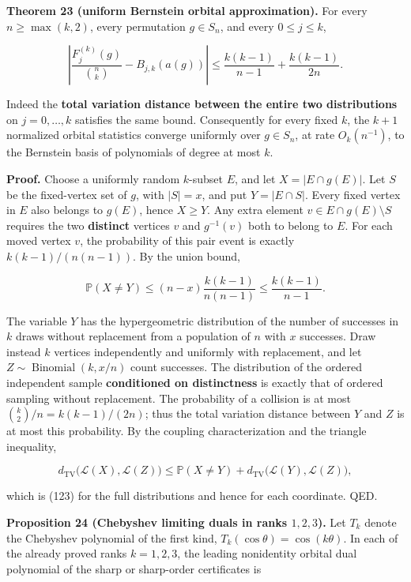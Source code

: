 \documentclass[
  11pt,
]{article}
\begin{document}
\textbf{Theorem 23 (uniform Bernstein orbital approximation).} For every
\(n\ge\max(k,2)\), every permutation \(g\in S_n\), and every
\(0\le j\le k\),

\[
\boxed{
\left|\frac{F_j^{(k)}(g)}{\binom nk}
       -B_{j,k}(a(g))\right|
\le\frac{k(k-1)}{n-1}+\frac{k(k-1)}{2n}.
} \tag{123}
\]

Indeed the \textbf{total variation distance between the entire two
distributions} on \(j=0,\ldots,k\) satisfies the same bound.
Consequently for every fixed \(k\), the \(k+1\) normalized orbital
statistics converge uniformly over \(g\in S_n\), at rate
\(O_k(n^{-1})\), to the Bernstein basis of polynomials of degree at most
\(k\).

\textbf{Proof.} Choose a uniformly random \(k\)-subset \(E\), and let
\(X=|E\cap g(E)|\). Let \(S\) be the fixed-vertex set of \(g\), with
\(|S|=x\), and put \(Y=|E\cap S|\). Every fixed vertex in \(E\) also
belongs to \(g(E)\), hence \(X\ge Y\). Any extra element
\(v\in E\cap g(E)\setminus S\) requires the two \textbf{distinct}
vertices \(v\) and \(g^{-1}(v)\) both to belong to \(E\). For each moved
vertex \(v\), the probability of this pair event is exactly
\(k(k-1)/(n(n-1))\). By the union bound,

\[
\mathbb P(X\ne Y)
\le (n-x)\frac{k(k-1)}{n(n-1)}
\le\frac{k(k-1)}{n-1}. \tag{124}
\]

The variable \(Y\) has the hypergeometric distribution of the number of
successes in \(k\) draws without replacement from a population of \(n\)
with \(x\) successes. Draw instead \(k\) vertices independently and
uniformly with replacement, and let
\(Z\sim\operatorname{Binomial}(k,x/n)\) count successes. The
distribution of the ordered independent sample \textbf{conditioned on
distinctness} is exactly that of ordered sampling without replacement.
The probability of a collision is at most \(\binom k2/n=k(k-1)/(2n)\);
thus the total variation distance between \(Y\) and \(Z\) is at most
this probability. By the coupling characterization and the triangle
inequality,

\[
d_{\mathrm{TV}}\bigl(\mathcal L(X),\mathcal L(Z)\bigr)
\le\mathbb P(X\ne Y)+
d_{\mathrm{TV}}\bigl(\mathcal L(Y),\mathcal L(Z)\bigr),
\]

which is (123) for the full distributions and hence for each coordinate.
QED.

\textbf{Proposition 24 (Chebyshev limiting duals in ranks \(1,2,3\)).}
Let \(T_k\) denote the Chebyshev polynomial of the first kind,
\(T_k(\cos\theta)=\cos(k\theta)\). In each of the already proved ranks
\(k=1,2,3\), the leading nonidentity orbital dual polynomial of the
sharp or sharp-order certificates is
\end{document}
